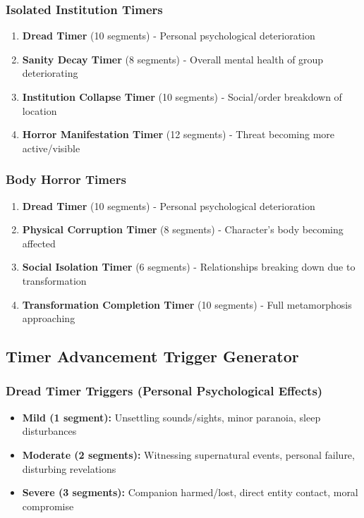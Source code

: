 \documentclass[11pt]{article}
\begin{document}
\subsubsection{Isolated Institution Timers}
\begin{enumerate}
\item \textbf{Dread Timer } (10 segments) - Personal psychological deterioration
\item \textbf{Sanity Decay Timer } (8 segments) - Overall mental health of group deteriorating
\item \textbf{Institution Collapse Timer } (10 segments) - Social/order breakdown of location
\item \textbf{Horror Manifestation Timer } (12 segments) - Threat becoming more active/visible
\end{enumerate}

\subsubsection{Body Horror Timers}
\begin{enumerate}
\item \textbf{Dread Timer } (10 segments) - Personal psychological deterioration
\item \textbf{Physical Corruption Timer } (8 segments) - Character's body becoming affected
\item \textbf{Social Isolation Timer } (6 segments) - Relationships breaking down due to transformation
\item \textbf{Transformation Completion Timer } (10 segments) - Full metamorphosis approaching
\end{enumerate}

\subsection{Timer Advancement Trigger Generator}

\subsubsection{Dread Timer Triggers (Personal Psychological Effects)}
\begin{itemize}
\item \textbf{Mild (1 segment):} Unsettling sounds/sights, minor paranoia, sleep disturbances
\item \textbf{Moderate (2 segments):} Witnessing supernatural events, personal failure, disturbing revelations
\item \textbf{Severe (3 segments):} Companion harmed/lost, direct entity contact, moral compromise
\end{itemize}
\end{document}
